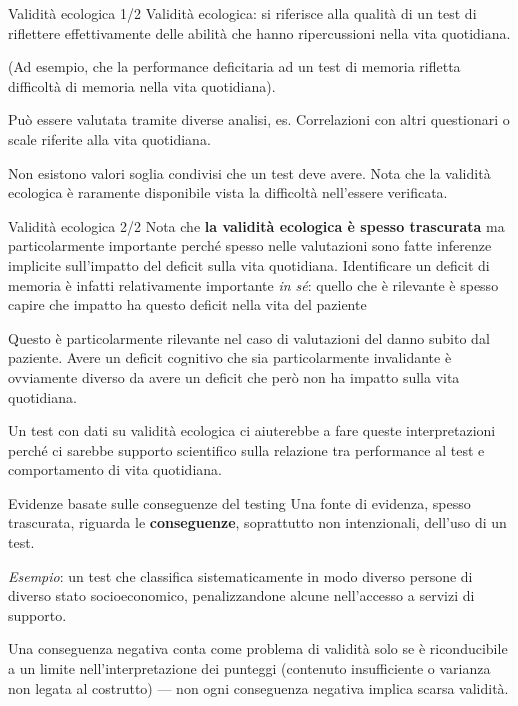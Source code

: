 \documentclass[
  ignorenonframetext,
]{beamer}
\begin{document}
\begin{frame}{Validità ecologica 1/2}
\label{validituxe0-ecologica-12}
Validità ecologica: si riferisce alla qualità di un test di riflettere
effettivamente delle abilità che hanno ripercussioni nella vita
quotidiana.

(Ad esempio, che la performance deficitaria ad un test di memoria
rifletta difficoltà di memoria nella vita quotidiana).

Può essere valutata tramite diverse analisi, es. Correlazioni con altri
questionari o scale riferite alla vita quotidiana.

Non esistono valori soglia condivisi che un test deve avere. Nota che la
validità ecologica è raramente disponibile vista la difficoltà
nell'essere verificata.
\end{frame}

\begin{frame}{Validità ecologica 2/2}
\label{validituxe0-ecologica-22}
Nota che \textbf{la validità ecologica è spesso trascurata} ma
particolarmente importante perché spesso nelle valutazioni sono fatte
inferenze implicite sull'impatto del deficit sulla vita quotidiana.
Identificare un deficit di memoria è infatti relativamente importante
\emph{in sé}: quello che è rilevante è spesso capire che impatto ha
questo deficit nella vita del paziente

Questo è particolarmente rilevante nel caso di valutazioni del danno
subito dal paziente. Avere un deficit cognitivo che sia particolarmente
invalidante è ovviamente diverso da avere un deficit che però non ha
impatto sulla vita quotidiana.

Un test con dati su validità ecologica ci aiuterebbe a fare queste
interpretazioni perché ci sarebbe supporto scientifico sulla relazione
tra performance al test e comportamento di vita quotidiana.
\end{frame}

\begin{frame}{Evidenze basate sulle conseguenze del testing}
\label{evidenze-basate-sulle-conseguenze-del-testing}
Una fonte di evidenza, spesso trascurata, riguarda le
\textbf{conseguenze}, soprattutto non intenzionali, dell'uso di un test.

\emph{Esempio}: un test che classifica sistematicamente in modo diverso
persone di diverso stato socioeconomico, penalizzandone alcune
nell'accesso a servizi di supporto.

\vfill

Una conseguenza negativa conta come problema di validità solo se è
riconducibile a un limite nell'interpretazione dei punteggi (contenuto
insufficiente o varianza non legata al costrutto) --- non ogni
conseguenza negativa implica scarsa validità.
\end{frame}
\end{document}
